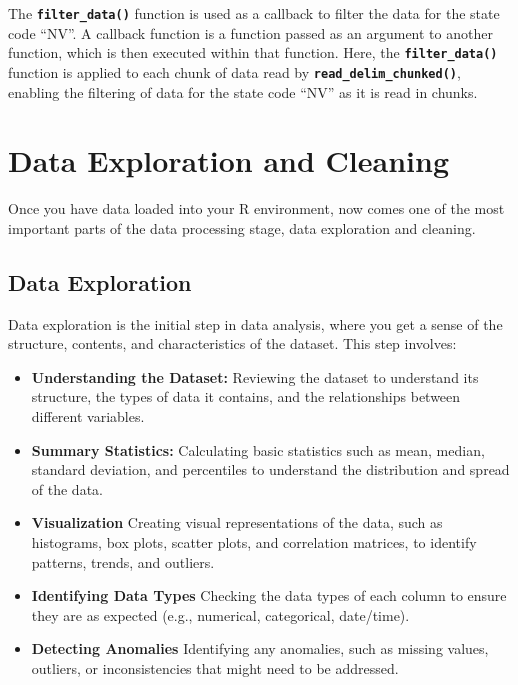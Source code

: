 \documentclass[
]{book}
\begin{document}
The \textbf{\texttt{filter\_data()}} function is used as a callback to filter the data for the state code ``NV''. A callback function is a function passed as an argument to another function, which is then executed within that function. Here, the \textbf{\texttt{filter\_data()}} function is applied to each chunk of data read by \textbf{\texttt{read\_delim\_chunked()}}, enabling the filtering of data for the state code ``NV'' as it is read in chunks.

\hypertarget{data-exploration-and-cleaning}{%
\chapter{Data Exploration and Cleaning}\label{data-exploration-and-cleaning}}

Once you have data loaded into your R environment, now comes one of the most important parts of the data processing stage, data exploration and cleaning.

\hypertarget{data-exploration}{%
\section*{Data Exploration}\label{data-exploration}}

Data exploration is the initial step in data analysis, where you get a sense of the structure, contents, and characteristics of the dataset. This step involves:

\begin{itemize}
\item
  \textbf{Understanding the Dataset:}
  Reviewing the dataset to understand its structure, the types of data it contains, and the relationships between different variables.
\item
  \textbf{Summary Statistics:}
  Calculating basic statistics such as mean, median, standard deviation, and percentiles to understand the distribution and spread of the data.
\item
  \textbf{Visualization}
  Creating visual representations of the data, such as histograms, box plots, scatter plots, and correlation matrices, to identify patterns, trends, and outliers.
\item
  \textbf{Identifying Data Types}
  Checking the data types of each column to ensure they are as expected (e.g., numerical, categorical, date/time).
\item
  \textbf{Detecting Anomalies}
  Identifying any anomalies, such as missing values, outliers, or inconsistencies that might need to be addressed.
\end{itemize}
\end{document}
